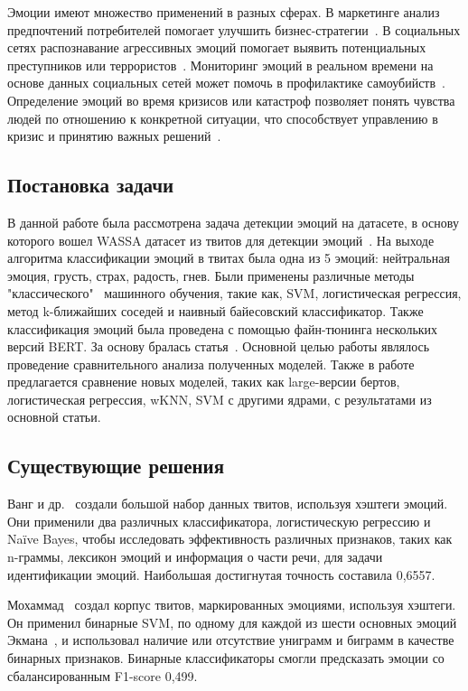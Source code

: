 \documentclass{article}
\begin{document}
Эмоции имеют множество применений в разных сферах.  В маркетинге анализ предпочтений потребителей помогает улучшить бизнес-стратегии~\cite{cambria}. В социальных сетях распознавание агрессивных эмоций  помогает выявить потенциальных преступников или террористов~\cite{cheong}. Мониторинг эмоций в реальном времени на основе данных социальных сетей может помочь в профилактике самоубийств~\cite{ren}. Определение эмоций во время кризисов или катастроф позволяет понять чувства людей по отношению к конкретной ситуации, что способствует управлению в кризис и принятию важных решений~\cite{ahmad}. 


\subsection{Постановка задачи}
В  данной работе была рассмотрена задача детекции эмоций на датасете, в основу которого вошел WASSA датасет из твитов для детекции эмоций~\cite{wassa}. На выходе алгоритма классификации эмоций в твитах была одна из 5 эмоций: нейтральная эмоция, грусть, страх, радость, гнев. Были применены различные методы "классического" \ машинного обучения, такие как, SVM, логистическая регрессия, метод k-ближайших
соседей и наивный байесовский классификатор. Также классификация эмоций была проведена с помощью файн-тюнинга нескольких версий BERT. За основу бралась статья~\cite{albu}. Основной целью работы являлось проведение сравнительного анализа полученных моделей. Также в работе предлагается сравнение новых моделей, таких как large-версии бертов, логистическая регрессия, wKNN, SVM с другими ядрами, с результатами из основной статьи.

\subsection{Существующие решения}


Ванг и др.~\cite{wang} создали большой набор данных твитов, используя хэштеги эмоций. Они применили два различных классификатора, логистическую регрессию и Naïve Bayes, чтобы исследовать эффективность различных признаков, таких как n-граммы, лексикон эмоций и информация о части речи, для задачи идентификации эмоций. Наибольшая достигнутая точность составила 0,6557.


Мохаммад~\cite{mohammad} создал корпус твитов, маркированных эмоциями, используя хэштеги. Он применил бинарные SVM, по одному для каждой из шести основных эмоций Экмана~\cite{ekman}, и использовал наличие или отсутствие униграмм и биграмм в качестве бинарных признаков. Бинарные классификаторы смогли предсказать эмоции со сбалансированным F1-score 0,499.
\end{document}
